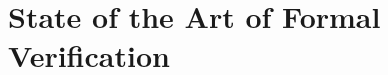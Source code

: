 \documentclass[oneside,a4paper]{memoir}
\begin{document}
\chapter{State of the Art of Formal Verification}

\end{document}
